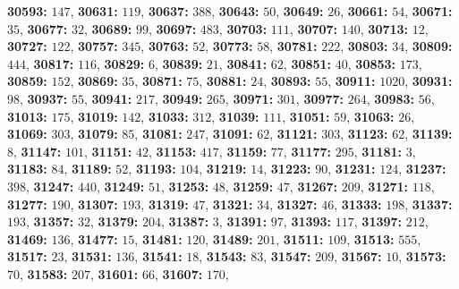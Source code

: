\textsf{\bfseries 30593:} $147$, \textsf{\bfseries 30631:} $119$, \textsf{\bfseries 30637:} $388$, \textsf{\bfseries 30643:} $50$, \textsf{\bfseries 30649:} $26$, \textsf{\bfseries 30661:} $54$, \textsf{\bfseries 30671:} $35$, \textsf{\bfseries 30677:} $32$, \textsf{\bfseries 30689:} $99$, \textsf{\bfseries 30697:} $483$, \textsf{\bfseries 30703:} $111$, \textsf{\bfseries 30707:} $140$, \textsf{\bfseries 30713:} $12$, \textsf{\bfseries 30727:} $122$, \textsf{\bfseries 30757:} $345$, \textsf{\bfseries 30763:} $52$, \textsf{\bfseries 30773:} $58$, \textsf{\bfseries 30781:} $222$, \textsf{\bfseries 30803:} $34$, \textsf{\bfseries 30809:} $444$, \textsf{\bfseries 30817:} $116$, \textsf{\bfseries 30829:} $6$, \textsf{\bfseries 30839:} $21$, \textsf{\bfseries 30841:} $62$, \textsf{\bfseries 30851:} $40$, \textsf{\bfseries 30853:} $173$, \textsf{\bfseries 30859:} $152$, \textsf{\bfseries 30869:} $35$, \textsf{\bfseries 30871:} $75$, \textsf{\bfseries 30881:} $24$, \textsf{\bfseries 30893:} $55$, \textsf{\bfseries 30911:} $1020$, \textsf{\bfseries 30931:} $98$, \textsf{\bfseries 30937:} $55$, \textsf{\bfseries 30941:} $217$, \textsf{\bfseries 30949:} $265$, \textsf{\bfseries 30971:} $301$, \textsf{\bfseries 30977:} $264$, \textsf{\bfseries 30983:} $56$, \textsf{\bfseries 31013:} $175$, \textsf{\bfseries 31019:} $142$, \textsf{\bfseries 31033:} $312$, \textsf{\bfseries 31039:} $111$, \textsf{\bfseries 31051:} $59$, \textsf{\bfseries 31063:} $26$, \textsf{\bfseries 31069:} $303$, \textsf{\bfseries 31079:} $85$, \textsf{\bfseries 31081:} $247$, \textsf{\bfseries 31091:} $62$, \textsf{\bfseries 31121:} $303$, \textsf{\bfseries 31123:} $62$, \textsf{\bfseries 31139:} $8$, \textsf{\bfseries 31147:} $101$, \textsf{\bfseries 31151:} $42$, \textsf{\bfseries 31153:} $417$, \textsf{\bfseries 31159:} $77$, \textsf{\bfseries 31177:} $295$, \textsf{\bfseries 31181:} $3$, \textsf{\bfseries 31183:} $84$, \textsf{\bfseries 31189:} $52$, \textsf{\bfseries 31193:} $104$, \textsf{\bfseries 31219:} $14$, \textsf{\bfseries 31223:} $90$, \textsf{\bfseries 31231:} $124$, \textsf{\bfseries 31237:} $398$, \textsf{\bfseries 31247:} $440$, \textsf{\bfseries 31249:} $51$, \textsf{\bfseries 31253:} $48$, \textsf{\bfseries 31259:} $47$, \textsf{\bfseries 31267:} $209$, \textsf{\bfseries 31271:} $118$, \textsf{\bfseries 31277:} $190$, \textsf{\bfseries 31307:} $193$, \textsf{\bfseries 31319:} $47$, \textsf{\bfseries 31321:} $34$, \textsf{\bfseries 31327:} $46$, \textsf{\bfseries 31333:} $198$, \textsf{\bfseries 31337:} $193$, \textsf{\bfseries 31357:} $32$, \textsf{\bfseries 31379:} $204$, \textsf{\bfseries 31387:} $3$, \textsf{\bfseries 31391:} $97$, \textsf{\bfseries 31393:} $117$, \textsf{\bfseries 31397:} $212$, \textsf{\bfseries 31469:} $136$, \textsf{\bfseries 31477:} $15$, \textsf{\bfseries 31481:} $120$, \textsf{\bfseries 31489:} $201$, \textsf{\bfseries 31511:} $109$, \textsf{\bfseries 31513:} $555$, \textsf{\bfseries 31517:} $23$, \textsf{\bfseries 31531:} $136$, \textsf{\bfseries 31541:} $18$, \textsf{\bfseries 31543:} $83$, \textsf{\bfseries 31547:} $209$, \textsf{\bfseries 31567:} $10$, \textsf{\bfseries 31573:} $70$, \textsf{\bfseries 31583:} $207$, \textsf{\bfseries 31601:} $66$, \textsf{\bfseries 31607:} $170$, 

